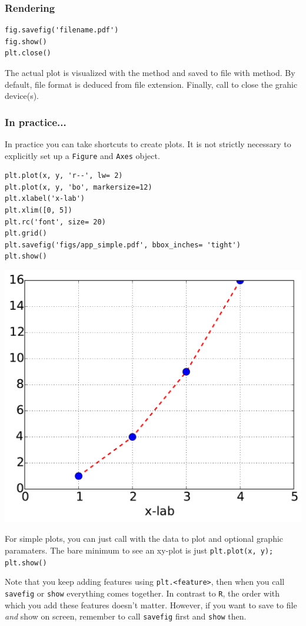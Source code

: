 \subsubsection{Rendering}

\begin{verbatim}
fig.savefig('filename.pdf')
fig.show()
plt.close()
\end{verbatim}

The actual plot is visualized with the  method and saved to file with
 method. By default, file format is deduced from file extension.
Finally, call  to close the grahic device(s).

\subsubsection{In practice...}

In practice you can take shortcuts to create plots. It is not strictly necessary
to explicitly set up a \texttt{Figure} and \texttt{Axes} object.

\begin{verbatim}
plt.plot(x, y, 'r--', lw= 2)
plt.plot(x, y, 'bo', markersize=12)
plt.xlabel('x-lab')
plt.xlim([0, 5])
plt.rc('font', size= 20)
plt.grid()
plt.savefig('figs/app_simple.pdf', bbox_inches= 'tight')
plt.show()
\end{verbatim}

\includegraphics[width=0.5\linewidth]{figs/app_simple.pdf}

For simple plots, you can just call  with the data to plot and
optional graphic paramaters. The bare minimum to see an xy-plot is just
\texttt{plt.plot(x, y); plt.show()}

Note that you keep adding features using \texttt{plt.<feature>},
then when you call \texttt{savefig} or \texttt{show} everything comes together.
In contrast to \texttt{R}, the order with which you add these features doesn't
matter. However, if you want to save to file \emph{and} show on screen, remember
to call \texttt{savefig} first and \texttt{show} then.

